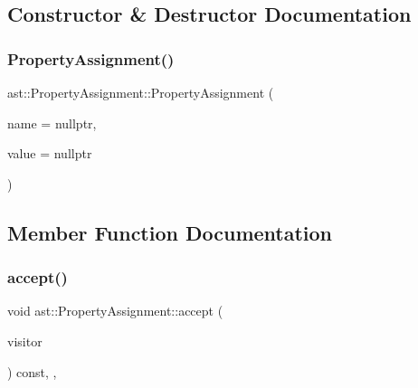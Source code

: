 \subsection{Constructor \& Destructor Documentation}
\mbox{\label{structast_1_1_property_assignment_a3126805bfc63f01db97974b10e19d204}} 
\subsubsection{\texorpdfstring{Property\+Assignment()}{PropertyAssignment()}}
{\footnotesize\ttfamily ast\+::\+Property\+Assignment\+::\+Property\+Assignment (\begin{DoxyParamCaption}\item[{\hyperlink{structast_1_1_property_name}{Property\+Name} $\ast$}]{name = {\ttfamily nullptr},  }\item[{\hyperlink{structast_1_1_expression}{Expression} $\ast$}]{value = {\ttfamily nullptr} }\end{DoxyParamCaption})\hspace{0.3cm}{\ttfamily [inline]}}



\subsection{Member Function Documentation}
\mbox{\label{structast_1_1_property_assignment_ace7339b9afcf7d9a6fb0a33ab27ccdc1}} 
\subsubsection{\texorpdfstring{accept()}{accept()}}
{\footnotesize\ttfamily void ast\+::\+Property\+Assignment\+::accept (\begin{DoxyParamCaption}\item[{\hyperlink{structast_1_1_visitor}{Visitor} \&}]{visitor }\end{DoxyParamCaption}) const\hspace{0.3cm}{\ttfamily [inline]}, {\ttfamily [override]}, {\ttfamily [virtual]}}



